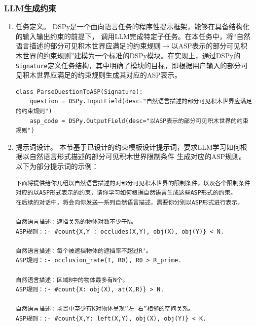 \subsubsection{LLM生成约束}
\label{self-define-func}
\begin{enumerate}[nosep]
\item 任务定义。
DSPy是一个面向语言任务的程序性提示框架，能够在具备结构化的输入输出约束的前提下，
调用LLM完成特定子任务。在本任务中，将“自然语言描述的部分可见积木世界应满足的约束规则$\rightarrow$以ASP表示的部分可见积木世界的约束规则”建模为一个标准的DSPy模块。在实现上，通过DSPy的\texttt{Signature}定义任务结构，其中明确了模块的目标，即根据用户输入的部分可见积木世界应满足的约束规则生成其对应的ASP表示。
\begin{lstlisting}
class ParseQuestionToASP(Signature):
    question = DSPy.InputField(desc="自然语言描述的部分可见积木世界应满足的约束规则")
    asp_code = DSPy.OutputField(desc="以ASP表示的部分可见积木世界的约束规则")
\end{lstlisting}
\item 提示词设计。
本节基于已设计的约束模板设计提示词，要求LLM学习如何根据以自然语言形式描述的部分可见积木世界限制条件
生成对应的ASP规则。以下为部分提示词的示例：
\begin{lstlisting}
下面将提供给你几组以自然语言描述的对部分可见积木世界的限制条件，以及各个限制条件对应的以ASP形式表示的约束，请你学习如何根据自然语言生成这些ASP形式的约束。
在后续的对话中，将会向你发送一系列自然语言描述，需要你分别以ASP形式进行表示。

自然语言描述：遮挡关系的物体对数不少于N。
ASP规则：:- #count{X,Y : occludes(X,Y), obj(X), obj(Y)} < N.

自然语言描述：每个被遮挡物体的遮挡率不超过R'。
ASP规则：:- occlusion_rate(T, R0), R0 > R_prime.

自然语言描述：区域R中的物体最多有N个。
ASP规则：:- #count{X: obj(X), at(X,R)} > N.

自然语言描述：场景中至少有K对物体呈现“左-右”相邻的空间关系。
ASP规则：:- #count{X,Y: left(X,Y), obj(X), obj(Y)} < K.


\end{lstlisting}
\end{enumerate}
